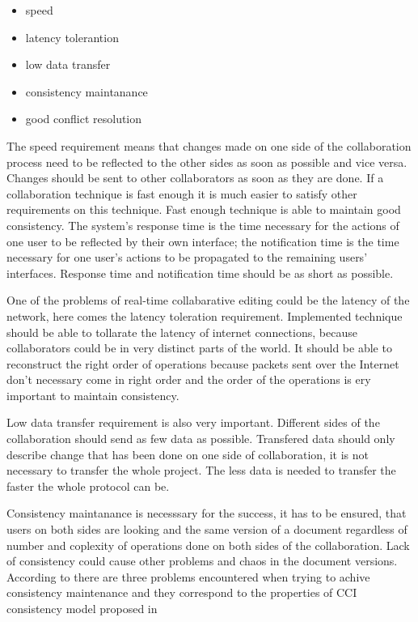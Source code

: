 \documentclass[12pt,oneside,draft]{fithesis2}
\begin{document}
\begin{itemize}
\item speed
\item latency tolerantion
\item low data transfer
\item consistency maintanance
\item good conflict resolution
\end{itemize}
\par The speed requirement means that changes made on one side of the collaboration process need to be reflected to the other sides as soon as possible and vice versa. Changes should be sent to other collaborators as soon as they are done. If a collaboration technique is fast enough it is much easier to satisfy other requirements on this technique. Fast enough technique is able to maintain good consistency. The system’s response time is the time necessary for the actions of one user to be reflected by their own interface; the notification time is the time necessary for one user’s actions to be propagated to the remaining users’ interfaces.\cite{Ellis} Response time and notification time should be as short as possible.  \par One of the problems of real-time collabarative editing could be the latency of the network, here comes the latency toleration requirement. Implemented technique should be able to tollarate the latency of internet connections, because collaborators could be in very distinct parts of the world. It should be able to reconstruct the right order of operations because packets sent over the Internet don't necessary come in right order and the order of the operations is ery important to maintain consistency.\par Low data transfer requirement is also very important. Different sides of the collaboration should send as few data as possible. Transfered data should only describe change that has been done on one side of collaboration, it is not necessary to transfer the whole project. The less data is needed to transfer the faster the whole protocol can be.  \par Consistency maintanance is necesssary for the success, it has to be ensured, that users on both sides are looking and the same version of a document regardless of number and coplexity of operations done on both sides of the collaboration. Lack of consistency could cause other problems and chaos in the document versions. According to \cite{Vidot} there are three problems encountered when trying to achive consistency maintenance and they correspond to the properties of CCI consistency model proposed in \cite{Sun}
\end{document}
